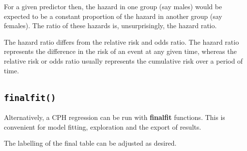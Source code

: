 \documentclass[
  12pt,
  krantz2]{krantz}
\makeatletter
\newenvironment{Shaded}{\begin{snugshade}}{\end{snugshade}}
\newcommand{\DataTypeTok}[1]{\textcolor[rgb]{0.13,0.29,0.53}{#1}}
\newcommand{\KeywordTok}[1]{\textcolor[rgb]{0.13,0.29,0.53}{\textbf{#1}}}
\newcommand{\NormalTok}[1]{#1}
\newcommand{\OperatorTok}[1]{\textcolor[rgb]{0.81,0.36,0.00}{\textbf{#1}}}
\newcommand{\OtherTok}[1]{\textcolor[rgb]{0.56,0.35,0.01}{#1}}
\newcommand{\StringTok}[1]{\textcolor[rgb]{0.31,0.60,0.02}{#1}}
\newenvironment{kframe}{%
\medskip{}
\setlength{\fboxsep}{.8em}
 \def\at@end@of@kframe{}%
 \ifinner\ifhmode%
  \def\at@end@of@kframe{\end{minipage}}%
  \begin{minipage}{\columnwidth}%
 \fi\fi%
 \def\FrameCommand##1{\hskip\@totalleftmargin \hskip-\fboxsep
 \colorbox{shadecolor}{##1}\hskip-\fboxsep
     \hskip-\linewidth \hskip-\@totalleftmargin \hskip\columnwidth}%
 \MakeFramed {\advance\hsize-\width
   \@totalleftmargin\z@ \linewidth\hsize
   \@setminipage}}%
 {\par\unskip\endMakeFramed%
 \at@end@of@kframe}
\renewenvironment{Shaded}{\begin{kframe}}{\end{kframe}}
\makeatother
\begin{document}
For a given predictor then, the hazard in one group (say males) would be expected to be a constant proportion of the hazard in another group (say females).
The ratio of these hazards is, unsurprisingly, the hazard ratio.

The hazard ratio differs from the relative risk and odds ratio.
The hazard ratio represents the difference in the risk of an event at any given time, whereas the relative risk or odds ratio usually represents the cumulative risk over a period of time.

\hypertarget{finalfit}{%
\subsection{\texorpdfstring{\texttt{finalfit()}}{finalfit()}}\label{finalfit}}

Alternatively, a CPH regression can be run with \textbf{finalfit} functions.
This is convenient for model fitting, exploration and the export of results.

\begin{Shaded}
\end{Shaded}

The labelling of the final table can be adjusted as desired.

\begin{Shaded}
\end{Shaded}
\end{document}
